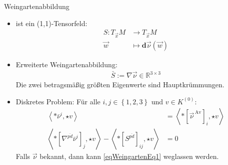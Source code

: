 \documentclass[handout]{beamer}
\newcommand{\R}{\mathds{R}}
\newcommand{\exd}{\mathbf{d}}
\newcommand{\vecover}[2]{\vec{#1}^{\,#2}}
\newcommand{\av}{\text{Av}}
\begin{document}
  \begin{frame}
    \begin{block}{Weingartenabbildung}
      \begin{itemize}
        \item<1-> ist ein (1,1)-Tensorfeld:
          \begin{align*}
            S: T_{\vec{x}}M &\rightarrow T_{\vec{x}}M \\
                    \vec{w} &\mapsto \exd\vec{\nu} \left( \vec{w} \right)
          \end{align*}
        \item<2-> Erweiterte Weingartenabbildung:
          \begin{align*}
            \bar{S}:= \nabla\vec{\nu} \in \R^{3 \times 3}
          \end{align*}
          Die zwei betragsmäßig größten Eigenwerte sind Hauptkrümmungen.
        \item<3-> Diskretes Problem: Für alle \( i,j\in\left\{ 1,2,3 \right\} \) und \( v\in K^{(0)} \):
          \begin{align}
            \label{eqWeingartenEq1}
        \left\langle *\bar{\nu}^{i} , \star v \right\rangle 
                &= \left\langle *\left[ \vecover{\nu}{\av} \right]_{i}, \star v \right\rangle \\
        \label{eqWeingartenEq2}
        \left\langle *\left[ \nabla^{\overline{pd}}\bar{\nu}^{i} \right]_{j} , \star v \right\rangle
            - \left\langle *\left[ S^{\overline{pd}} \right]_{ij} , \star v \right\rangle 
                &= 0
          \end{align}
         Falls \( \vec{\nu} \) bekannt, dann kann \eqref{eqWeingartenEq1} weglassen werden.
      \end{itemize}
    \end{block}
  \end{frame}
\end{document}
